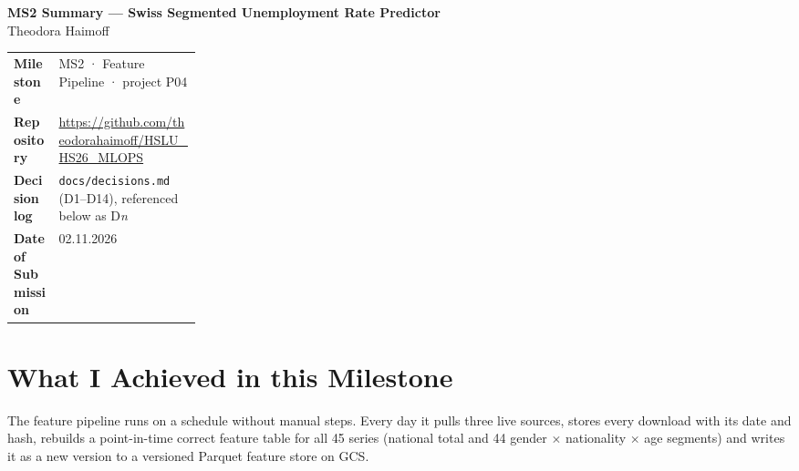 \documentclass[11pt,a4paper]{article}
\newcommand{\file}[1]{\texttt{#1}}
\begin{document}
	\thispagestyle{firstpage}
	
	
	\vspace{4mm}
	
	{\Large\bfseries\color{hsluDark}MS2 Summary --- Swiss Segmented Unemployment Rate Predictor}\\[1mm]
	{\large\color{hsluGray}Theodora Haimoff}
	
	\vspace{4mm}
	
	\colorbox{boxGray}{%
		\parbox{\dimexpr\linewidth-2\fboxsep\relax}{
			\vspace{1mm}
			\renewcommand{\arraystretch}{1.35}
			\begin{tabularx}{\linewidth}{>{\bfseries}p{0.24\linewidth} X}
				Milestone & MS2 · Feature Pipeline · project P04\\
				Repository & \url{https://github.com/theodorahaimoff/HSLU_HS26_MLOPS} \\
				Decision log & \file{docs/decisions.md} (D1--D14), referenced below as D\textit{n}\\
				Date of Submission & 02.11.2026\\
			\end{tabularx}
			\vspace{1mm}
		}
	}
	
	\vspace{0.6em}
	
	\section{What I Achieved in this Milestone}
	
	The feature pipeline runs on a schedule without manual steps. Every day it pulls three live sources, stores every
	download with its date and hash, rebuilds a point-in-time correct feature table for all 45 series (national total
	and 44 gender $\times$ nationality $\times$ age segments) and writes it as a new version to a versioned Parquet
	feature store on GCS.
	
\end{document}
